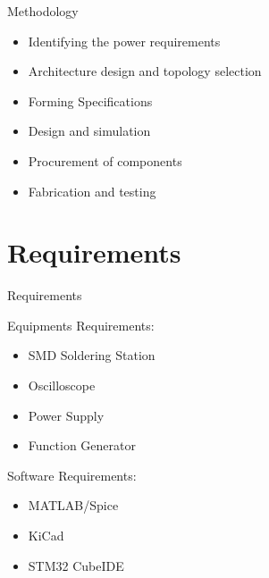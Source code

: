 \documentclass[aspectratio=169]{beamer}
\begin{document}
	
	
	
	
	
	\begin{frame}{Methodology}
		\begin{itemize}
			
			\item Identifying the power requirements
			\item Architecture design and topology selection
			\item Forming Specifications
			
			\item Design and simulation
			\item Procurement of components
			\item Fabrication and testing
			
		\end{itemize} 
		
	\end{frame}
	
	
	\section{Requirements}
	\begin{frame}{Requirements}
		\begin{minipage}{0.5\textwidth}
			Equipments Requirements:
			\begin{itemize}
				
				\item SMD Soldering Station
				\item Oscilloscope
				\item Power Supply
				\item Function Generator
			\end{itemize} 
		\end{minipage}
		\begin{minipage}{0.3\textwidth}
			Software Requirements:
			\begin{itemize}
				
				\item MATLAB/Spice
				\item KiCad
				\item STM32 CubeIDE
				
			\end{itemize} 
			
		\end{minipage}
	\end{frame}
	
	
	
\end{document}
